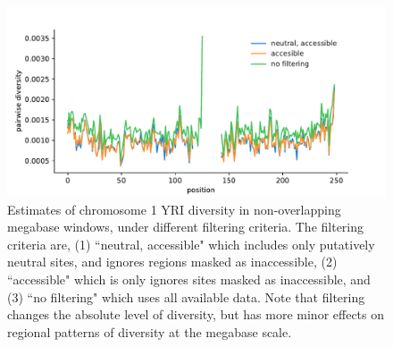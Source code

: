\documentclass[11pt]{article}
\begin{document}
\begin{figure}[!htb]
  \centering
  \includegraphics{figures/supplementary/chr1_diversity_filtering.pdf}

  \caption{Estimates of chromosome 1 YRI diversity in non-overlapping megabase
    windows, under different filtering criteria. The filtering criteria are,
    (1) ``neutral, accessible" which includes only putatively neutral sites, and
    ignores regions masked as inaccessible, (2) ``accessible" which is only ignores
  sites masked as inaccessible, and (3) ``no filtering" which uses all available
data. Note that filtering changes the absolute level of diversity, but has more
minor effects on regional patterns of diversity at the megabase scale.}

  \label{suppfig:chr1-diversity}
\end{figure}
\end{document}
